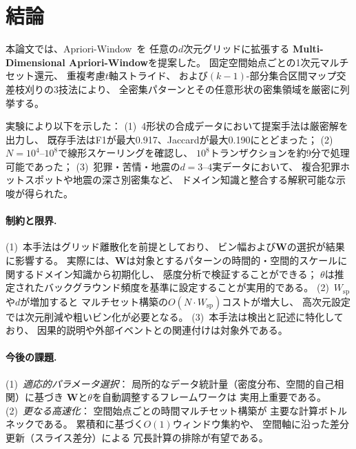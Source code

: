 \section{結論}\label{sec:conclusion}

本論文では、Apriori-Window~\cite{aprioriwindow}を
任意の$d$次元グリッドに拡張する
\textbf{Multi-Dimensional Apriori-Window}を提案した。
固定空間始点ごとの1次元マルチセット還元、
重複考慮$t$軸ストライド、
および$(k{-}1)$-部分集合区間マップ交差枝刈りの3技法により、
全密集パターンとその任意形状の密集領域を厳密に列挙する。

実験により以下を示した：
(1)~4形状の合成データにおいて提案手法は厳密解を出力し、
既存手法はF1が最大0.917、Jaccardが最大0.190にとどまった；
(2)~$N = 10^4$--$10^8$で線形スケーリングを確認し、
$10^8$トランザクションを約9分で処理可能であった；
(3)~犯罪・苦情・地震の$d{=}3$--$4$実データにおいて、
複合犯罪ホットスポットや地震の深さ別密集など、
ドメイン知識と整合する解釈可能な示唆が得られた。

\paragraph{制約と限界.}
(1)~本手法はグリッド離散化を前提としており、
ビン幅および$\bm{W}$の選択が結果に影響する。
実際には、$\bm{W}$は対象とするパターンの時間的・空間的スケールに関するドメイン知識から初期化し、
感度分析で検証することができる；
$\theta$は推定されたバックグラウンド頻度を基準に設定することが実用的である。
(2)~$W_{\mathrm{sp}}$や$d$が増加すると
マルチセット構築の$O(N \cdot W_{\mathrm{sp}})$コストが増大し、
高次元設定では次元削減や粗いビン化が必要となる。
(3)~本手法は検出と記述に特化しており、
因果的説明や外部イベントとの関連付けは対象外である。

\paragraph{今後の課題.}
(1)~\emph{適応的パラメータ選択}：
局所的なデータ統計量（密度分布、空間的自己相関）に基づき
$\bm{W}$と$\theta$を自動調整するフレームワークは
実用上重要である。
(2)~\emph{更なる高速化}：
空間始点ごとの時間マルチセット構築が
主要な計算ボトルネックである。
累積和に基づく$O(1)$ウィンドウ集約や、
空間軸に沿った差分更新（スライス差分）による
冗長計算の排除が有望である。
